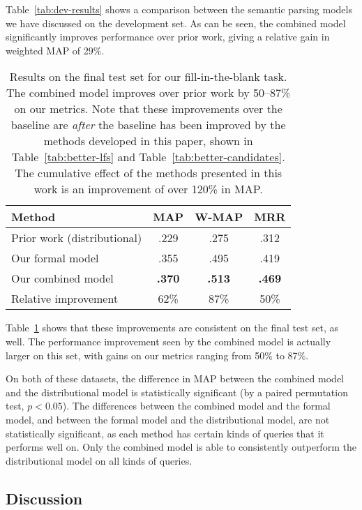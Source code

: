 \documentclass[11pt]{article}
\newcommand{\tabref}[1]{Table~\ref{tab:#1}}
\begin{document}
\tabref{dev-results} shows a comparison between the semantic parsing models we
have discussed on the development set.  As can be seen, the combined model
significantly improves performance over prior work, giving a relative gain in
weighted MAP of 29\%.

\begin{table}
  \centering
  {\small
    \begin{tabular}{lccc}
      \toprule
      Method & MAP & W-MAP & MRR \\
      \midrule
      Prior work (distributional) & .229 & .275 & .312 \\
      \midrule
      Our formal model & .355 & .495 & .419 \\
      \midrule
      Our combined model & \textbf{.370} & \textbf{.513} & \textbf{.469} \\
      \midrule
      \midrule
      Relative improvement & 62\% & 87\% & 50\% \\
      \bottomrule
    \end{tabular}
  }
  \caption{Results on the final test set for our fill-in-the-blank task.  The
  combined model improves over prior work by 50--87\% on our metrics.  Note
  that these improvements over the baseline are \emph{after} the baseline has
  been improved by the methods developed in this paper, shown in
  \tabref{better-lfs} and \tabref{better-candidates}.  The cumulative effect of
  the methods presented in this work is an improvement of over 120\% in MAP.}
  \label{tab:final-results}
\end{table}

\tabref{final-results} shows that these improvements are consistent on the
final test set, as well.  The performance improvement seen by the combined
model is actually larger on this set, with gains on our metrics ranging from
50\% to 87\%.

On both of these datasets, the difference in MAP between the combined model and
the distributional model is statistically significant (by a paired permutation
test, $p < 0.05$).  The differences between the combined model and the formal
model, and between the formal model and the distributional model, are not
statistically significant, as each method has certain kinds of queries that it
performs well on.  Only the combined model is able to consistently outperform
the distributional model on all kinds of queries.

\subsection{Discussion}
\end{document}
